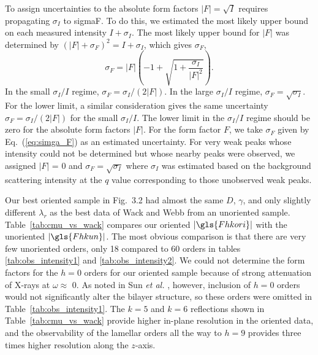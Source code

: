 To assign uncertainties to the absolute 
form factors $|F|=\sqrt{I}$ requires propagating $\sigma_I$ to \gls{sigmaF}.
To do this, we estimated the most likely upper bound on each measured intensity 
$I+\sigma_I$. The most likely upper bound for $|F|$ was determined by
$(|F|+\sigma_F)^2=I+\sigma_I$, which gives $\sigma_F$,
\begin{equation}
\label{eq:simga_F}
  \sigma_F=|F|\left(-1+\sqrt{1+\frac{\sigma_I}{|F|^2}}\right).
\end{equation}
In the small $\sigma_I/I$ regime, $\sigma_F=\sigma_I/(2|F|)$. In the 
large $\sigma_I/I$ regime, $\sigma_F=\sqrt{\sigma_I}$. For the lower limit,
a similar consideration gives the same uncertainty $\sigma_F=\sigma_I/(2|F|)$
for the small $\sigma_I/I$. The lower limit in the $\sigma_I/I$ regime
should be zero for the absolute form factors $|F|$. For the form factor $F$,
we take $\sigma_F$ given by Eq.~(\ref{eq:simga_F}) as an estimated 
uncertainty. For very weak peaks whose intensity could not be determined but
whose nearby peaks were observed, we assigned $|F|$ = 0 and 
$\sigma_F = \sqrt{\sigma_I}$ where $\sigma_I$ was estimated based on the
background scattering intensity at the $q$ value corresponding to those
unobserved weak peaks. 

Our best oriented sample in Fig.~3.2 had almost the same $D$, $\gamma$, and 
only slightly different ${\lambda}_r$ as the best data of Wack and Webb 
\cite{ref:Wack89} from an unoriented sample. 
Table~\ref{tab:cmu_vs_wack} compares our oriented 
$\left|\gls{Fhkori}\right|$ with the unoriented 
$\left|\gls{Fhkun}\right|$. The most obvious comparison is that there 
are very few unoriented orders, only 18 compared to 60 orders in tables 
\ref{tab:obs_intensity1} and \ref{tab:obs_intensity2}.
We could not determine the form factors for the $h=0$ orders for our
oriented sample because of strong attenuation of X-rays 
at $\omega \approx$ 0\textdegree.
As noted in Sun \textit{et al.} \cite{ref:Sun96}, however,
inclusion of $h=0$ orders would not significantly alter the bilayer 
structure, so these orders were omitted in Table~\ref{tab:obs_intensity1}.
The $k=5$ and $k=6$ reflections shown in Table~\ref{tab:cmu_vs_wack} 
provide 
higher in-plane resolution in the oriented data, 
and the observability of the 
lamellar orders all the way to $h=9$ provides three times higher resolution 
along the $z$-axis.

